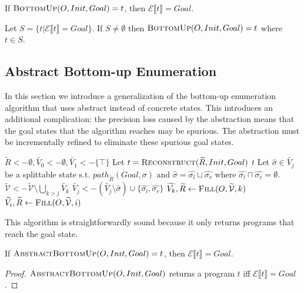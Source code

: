 \documentclass[authordraft,acmsmall,10pt]{acmart}
\newcommand{\abs}[1]{\ensuremath{\widetilde{#1}}}
\renewcommand{\eval}[1]{\ensuremath{\mathcal{E}\llbracket#1\rrbracket}}
\begin{document}
\begin{theorem}[Soundness]
  If $\Call{BottomUp}{O, Init, Goal} = t$, then $\eval{t} = Goal$.
\end{theorem}

\begin{theorem}[Completeness]
  Let $S = \{t | \eval{t} = Goal\}$. If $S \neq \emptyset$ then
  $\Call{BottomUp}{O, Init, Goal} = t$ where $t \in S$.
\end{theorem}

\subsection{Abstract Bottom-up Enumeration}

In this section we introduce a generalization of the bottom-up enumeration
algorithm that uses abstract instead of concrete states. This introduces an
additional complication: the precision loss caused by the abstraction means that
the goal states that the algorithm reaches may be spurious. The abstraction must
be incrementally refined to eliminate these spurious goal states.

\begin{algorithm}
  \begin{algorithmic}[1]
    \State $\abs{R} <- \emptyset, \abs{V_0} <- \emptyset, \abs{V_1} <- \{\top\}$
    \While {$Goal \in \abs{\mathcal{V}}$}
    \State Let $t = \Call{Reconstruct}{\abs{R}, Init, Goal}$
    \If {$\eval{t} = Goal$}
    \State \Return $t$
    \EndIf
    \State Let $\hat{\sigma} \in \abs{V_j}$ be a splittable state s.t.
    $path_{\abs{R}}(Goal, \sigma)$ and $\hat{\sigma} = \hat{\sigma_l} \sqcup
    \hat{\sigma_r}$ where $\hat{\sigma_l} \sqcap \hat{\sigma_r} = \emptyset$.
    \State $\abs{\mathcal{V}} <- \abs{\mathcal{V}} \setminus \bigcup_{k > j} \abs{V_k}$
    \State $\abs{V_j} <- (\abs{V_j} \setminus \hat{\sigma}) \cup
    \{\hat{\sigma_l}, \hat{\sigma_r}\}$
    \State $\abs{V_k}, \abs{R} <- \Call{Fill}{O, \abs{\mathcal{V}}, k}$
    \EndFor
    \EndWhile
    \State $\abs{V_i}, \abs{R} <- \Call{Fill}{O, \abs{\mathcal{V}}, i}$
    \EndFor
    \EndFunction
  \end{algorithmic}
\end{algorithm}

This algorithm is straightforwardly sound because it only returns programs that
reach the goal state.
\begin{theorem}
  If $\Call{AbstractBottomUp}{O, Init, Goal} = t$, then $\eval{t} = Goal$.
\end{theorem}
\begin{proof}
  $\Call{AbstractBottomUp}{O, Init, Goal}$ returns a program $t$ iff $\eval{t} = Goal$.
\end{proof}
\end{document}
